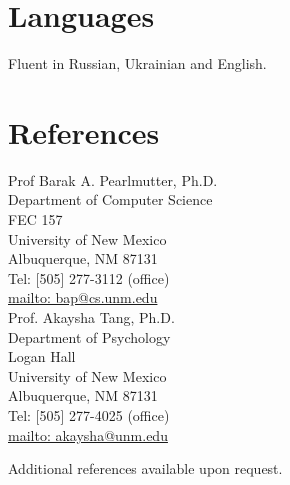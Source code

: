 \documentclass[10pt,overlapped,line]{res}
\begin{document}
\begin{resume}
\section{Languages}
Fluent in Russian, Ukrainian and English. 


\section{References}
 \begin{multicols}{2}
{\small
   Prof Barak A. Pearlmutter, Ph.D. \\
   Department of Computer Science \\
   FEC 157 \\
   University of New Mexico \\
   Albuquerque, NM  87131 \\
   Tel: [505] 277-3112 (office) \\
   \href{URL}{mailto: bap@cs.unm.edu} \\

   Prof. Akaysha Tang, Ph.D.\\
   Department of Psychology \\
   Logan Hall \\
   University of New Mexico \\
   Albuquerque, NM 87131 \\
   Tel: [505] 277-4025 (office) \\
   \href{URL}{mailto: akaysha@unm.edu} \\
}
\end{multicols}

Additional references available upon request.



\end{resume}
\end{document}
